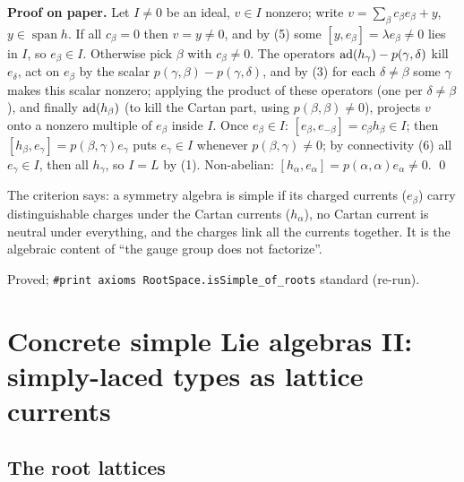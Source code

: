 \textbf{Proof on paper.} Let $I\ne0$ be an ideal, $v\in I$ nonzero; write $v=\sum_\beta c_\beta e_\beta+y$, $y\in\operatorname{span}h$.
If all $c_\beta=0$ then $v=y\neq0$, and by (5) some $[y,e_\beta]=\lambda e_\beta\ne0$ lies in $I$, so $e_\beta\in I$. Otherwise pick
$\beta$ with $c_\beta\ne0$. The operators $\operatorname{ad}(h_\gamma)-p(\gamma,\delta)$ kill $e_\delta$, act on $e_\beta$ by the scalar
$p(\gamma,\beta)-p(\gamma,\delta)$, and by (3) for each $\delta\ne\beta$ some $\gamma$ makes this scalar nonzero; applying the product
of these operators (one per $\delta\neq\beta$), and finally $\operatorname{ad}(h_\beta)$ (to kill the Cartan part, using $p(\beta,\beta)\ne0$),
projects $v$ onto a nonzero multiple of $e_\beta$ inside $I$. Once $e_\beta\in I$: $[e_\beta,e_{-\beta}]=c_\beta h_\beta\in I$; then
$[h_\beta,e_\gamma]=p(\beta,\gamma)e_\gamma$ puts $e_\gamma\in I$ whenever $p(\beta,\gamma)\ne0$; by connectivity (6) all
$e_\gamma\in I$, then all $h_\gamma$, so $I=L$ by (1). Non-abelian: $[h_\alpha,e_\alpha]=p(\alpha,\alpha)e_\alpha\ne0$. \qed

\begin{physics}
The criterion says: a symmetry algebra is simple if its charged currents ($e_\beta$) carry distinguishable charges under the Cartan
currents ($h_\alpha$), no Cartan current is neutral under everything, and the charges link all the currents together. It is the
algebraic content of ``the gauge group does not factorize''.
\end{physics}

\begin{status}
Proved; \texttt{\#print axioms RootSpace.isSimple\_of\_roots} standard (re-run).
\end{status}

\section{Concrete simple Lie algebras II: simply-laced types as lattice currents}\label{l23:sec:lattice}

\subsection{The root lattices}

